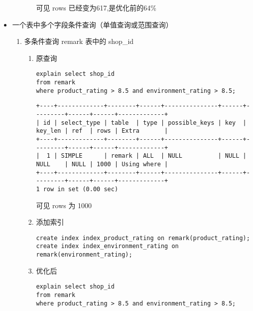 \documentclass[11pt]{article}
\begin{document}
\begin{itemize}
\begin{enumerate}
\begin{enumerate}
可见 rows 已经变为617,是优化前的64\%
\end{enumerate}
\end{enumerate}
\item 一个表中多个字段条件查询（单值查询或范围查询）
\label{sec-3-2-1-6}
\begin{enumerate}
\item 多条件查询 remark 表中的 shop\_id
\begin{enumerate}
\item 原查询

\begin{lstlisting}
explain select shop_id
from remark
where product_rating > 8.5 and environment_rating > 8.5;
\end{lstlisting}

\begin{verbatim}
+----+-------------+--------+------+---------------+------+---------+------+------+-------------+
| id | select_type | table  | type | possible_keys | key  | key_len | ref  | rows | Extra       |
+----+-------------+--------+------+---------------+------+---------+------+------+-------------+
|  1 | SIMPLE      | remark | ALL  | NULL          | NULL | NULL    | NULL | 1000 | Using where |
+----+-------------+--------+------+---------------+------+---------+------+------+-------------+
1 row in set (0.00 sec)
\end{verbatim}

可见 rows 为 1000

\item 添加索引

\begin{lstlisting}
create index index_product_rating on remark(product_rating);
create index index_environment_rating on remark(environment_rating);
\end{lstlisting}

\item 优化后

\begin{lstlisting}
explain select shop_id
from remark
where product_rating > 8.5 and environment_rating > 8.5;
\end{lstlisting}


\end{enumerate}
\end{enumerate}
\end{itemize}
\end{document}
